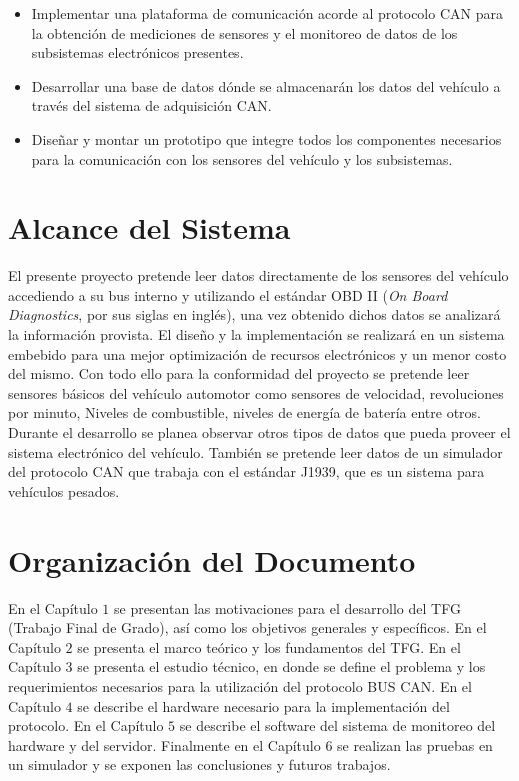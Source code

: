 \begin{itemize}
	\item	Implementar una plataforma de comunicación acorde al protocolo CAN para la obtención de mediciones de sensores y el monitoreo de datos de los subsistemas electrónicos presentes.
	
	\item Desarrollar una base de datos dónde se almacenarán los datos del vehículo a través del sistema de adquisición CAN.
	
	\item Diseñar y montar un prototipo que integre todos los componentes necesarios para la comunicación con los sensores del vehículo y los subsistemas.
	
		
\end{itemize}

\section{Alcance del Sistema}
 El presente proyecto pretende leer datos directamente de los sensores del vehículo accediendo a su bus interno y utilizando el estándar OBD II (\textit{On Board Diagnostics}, por sus siglas en inglés), una vez obtenido dichos datos se analizará la información provista.  El diseño y la implementación se realizará en un sistema embebido para una mejor optimización de recursos electrónicos y un menor costo del mismo. Con todo ello para la conformidad del proyecto se pretende leer sensores básicos del vehículo automotor como sensores de velocidad, revoluciones por minuto, Niveles de combustible, niveles de energía de batería entre otros. Durante el desarrollo se planea observar otros tipos de datos que pueda proveer el sistema electrónico del vehículo. También se pretende leer datos de un simulador del protocolo CAN que trabaja con el estándar J1939, que es un sistema para vehículos pesados. 
 
 
\section{Organización del Documento}


En el Capítulo $1$ se presentan las motivaciones para el desarrollo del TFG (Trabajo Final de Grado), así como los objetivos generales y específicos. En el Capítulo $2$ se presenta el marco teórico y los fundamentos del TFG. En el Capítulo $3$ se presenta el estudio técnico, en donde se define el problema y los requerimientos necesarios para la utilización del protocolo BUS CAN. En el Capítulo $4$ se describe el hardware necesario para la implementación del protocolo. En el Capítulo $5$  se describe el software del sistema de monitoreo del hardware y del servidor. Finalmente en el Capítulo $6$ se realizan las pruebas en un simulador y se exponen las conclusiones y futuros trabajos.




